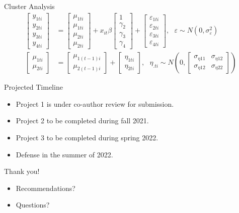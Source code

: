 \documentclass[
  ignorenonframetext,
]{beamer}
\providecommand{\tightlist}{%
  \setlength{\itemsep}{0pt}\setlength{\parskip}{0pt}}
\begin{document}
\begin{frame}{Cluster Analysis}
\protect\hypertarget{cluster-analysis}{}
\begin{align*}
\begin{bmatrix}
y_{1ti} \\
y_{2ti} \\
y_{3ti} \\
y_{4ti}
\end{bmatrix} &=
\begin{bmatrix}
\mu_{1ti} \\
\mu_{1ti} \\
\mu_{2ti} \\
\mu_{2ti}
\end{bmatrix} +
x_{it} \beta
\begin{bmatrix}
1 \\
\gamma_2 \\
\gamma_3 \\
\gamma_4
\end{bmatrix} +
\begin{bmatrix}
\varepsilon_{1ti} \\
\varepsilon_{2ti} \\
\varepsilon_{3ti} \\
\varepsilon_{4ti}
\end{bmatrix} , \ \ \ \varepsilon \sim N(0, \sigma^2_\varepsilon)\\
\begin{bmatrix}
\mu_{1ti} \\
\mu_{2ti}
\end{bmatrix} &= 
\begin{bmatrix}
\mu_{1(t-1)i} \\
\mu_{2(t-1)i}
\end{bmatrix} + 
\begin{bmatrix}
\eta_{1ti} \\
\eta_{2ti}
\end{bmatrix}, \ \ \ \eta_{.ti} \sim N(0,
\begin{bmatrix}
\sigma_{\eta11} & \sigma_{\eta12}\\
\sigma_{\eta12} & \sigma_{\eta22}
\end{bmatrix}
)
\end{align*}
\end{frame}

\begin{frame}{Projected Timeline}
\protect\hypertarget{projected-timeline}{}
\begin{itemize}
\tightlist
\item
  Project 1 is under co-author review for submission.
\item
  Project 2 to be completed during fall 2021.
\item
  Project 3 to be completed during spring 2022.
\item
  Defense in the summer of 2022.
\end{itemize}
\end{frame}

\begin{frame}{Thank you!}
\protect\hypertarget{thank-you}{}
\begin{itemize}
\tightlist
\item
  Recommendations?
\item
  Questions?
\end{itemize}
\end{frame}
\end{document}
